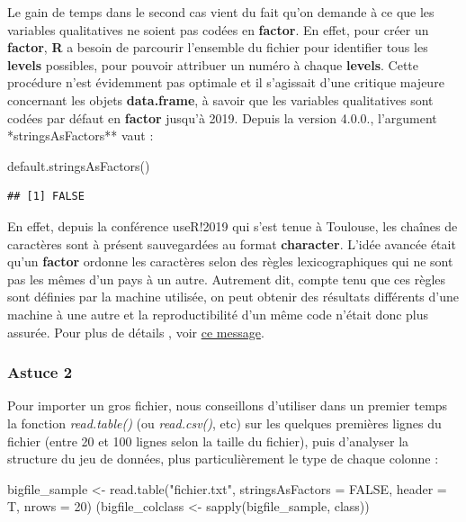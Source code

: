 \documentclass[
]{book}
\newenvironment{Shaded}{\begin{snugshade}}{\end{snugshade}}
\newcommand{\AttributeTok}[1]{\textcolor[rgb]{0.77,0.63,0.00}{#1}}
\newcommand{\ConstantTok}[1]{\textcolor[rgb]{0.00,0.00,0.00}{#1}}
\newcommand{\DecValTok}[1]{\textcolor[rgb]{0.00,0.00,0.81}{#1}}
\newcommand{\FunctionTok}[1]{\textcolor[rgb]{0.00,0.00,0.00}{#1}}
\newcommand{\NormalTok}[1]{#1}
\newcommand{\OtherTok}[1]{\textcolor[rgb]{0.56,0.35,0.01}{#1}}
\newcommand{\StringTok}[1]{\textcolor[rgb]{0.31,0.60,0.02}{#1}}
\theoremstyle{definition}
\theoremstyle{definition}
\theoremstyle{definition}
\theoremstyle{definition}
\theoremstyle{remark}
\begin{document}
Le gain de temps dans le second cas vient du fait qu'on demande à ce que les variables qualitatives ne soient pas codées en \textbf{factor}. En effet, pour créer un \textbf{factor}, \textbf{R} a besoin de parcourir l'ensemble du fichier pour identifier tous les \textbf{levels} possibles, pour pouvoir attribuer un numéro à chaque \textbf{levels}. Cette procédure n'est évidemment pas optimale et il s'agissait d'une critique majeure concernant les objets \textbf{data.frame}, à savoir que les variables qualitatives sont codées par défaut en \textbf{factor} jusqu'à 2019. Depuis la version 4.0.0., l'argument *stringsAsFactors** vaut :

\begin{Shaded}
\begin{Highlighting}[]
\FunctionTok{default.stringsAsFactors}\NormalTok{()}
\end{Highlighting}
\end{Shaded}

\begin{verbatim}
## [1] FALSE
\end{verbatim}

En effet, depuis la conférence useR!2019 qui s'est tenue à Toulouse, les chaînes de caractères sont à présent sauvegardées au format \textbf{character}. L'idée avancée était qu'un \textbf{factor} ordonne les caractères selon des règles lexicographiques qui ne sont pas les mêmes d'un pays à un autre. Autrement dit, compte tenu que ces règles sont définies par la machine utilisée, on peut obtenir des résultats différents d'une machine à une autre et la reproductibilité d'un même code n'était donc plus assurée. Pour plus de détails , voir \href{https://developer.r-project.org/Blog/public/2020/02/16/stringsasfactors/index.html}{ce message}.

\hypertarget{astuce-2}{%
\subsubsection{Astuce 2}\label{astuce-2}}

Pour importer un gros fichier, nous conseillons d'utiliser dans un premier temps la fonction \emph{read.table()} (ou \emph{read.csv()}, etc) sur les quelques premières lignes du fichier (entre 20 et 100 lignes selon la taille du fichier), puis d'analyser la structure du jeu de données, plus particulièrement le type de chaque colonne :

\begin{Shaded}
\begin{Highlighting}[]
\NormalTok{bigfile\_sample }\OtherTok{\textless{}{-}} \FunctionTok{read.table}\NormalTok{(}\StringTok{"fichier.txt"}\NormalTok{, }\AttributeTok{stringsAsFactors =} \ConstantTok{FALSE}\NormalTok{, }
                             \AttributeTok{header =}\NormalTok{ T, }\AttributeTok{nrows =} \DecValTok{20}\NormalTok{)}
\NormalTok{(bigfile\_colclass }\OtherTok{\textless{}{-}} \FunctionTok{sapply}\NormalTok{(bigfile\_sample, class))}
\end{Highlighting}
\end{Shaded}
\end{document}
